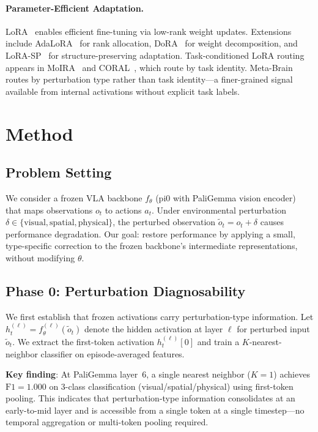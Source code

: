 \documentclass[10pt,twocolumn]{article}
\newcommand{\ours}{Meta-Brain}
\begin{document}
\paragraph{Parameter-Efficient Adaptation.}
LoRA~\cite{hu2021lora} enables efficient fine-tuning via low-rank weight updates.
Extensions include AdaLoRA~\cite{zhang2023adalora} for rank allocation, DoRA~\cite{liu2024dora} for weight decomposition, and LoRA-SP~\cite{lorasp2025} for structure-preserving adaptation.
Task-conditioned LoRA routing appears in MoIRA~\cite{moira2025} and CORAL~\cite{coral2025}, which route by task identity.
\ours{} routes by perturbation type rather than task identity---a finer-grained signal available from internal activations without explicit task labels.


\section{Method}
\label{sec:method}

\subsection{Problem Setting}
\label{sec:problem}

We consider a frozen VLA backbone $f_\theta$ (pi0 with PaliGemma vision encoder) that maps observations $o_t$ to actions $a_t$.
Under environmental perturbation $\delta \in \{\text{visual}, \text{spatial}, \text{physical}\}$, the perturbed observation $\tilde{o}_t = o_t + \delta$ causes performance degradation.
Our goal: restore performance by applying a small, type-specific correction to the frozen backbone's intermediate representations, without modifying $\theta$.

\subsection{Phase 0: Perturbation Diagnosability}
\label{sec:phase0}

We first establish that frozen activations carry perturbation-type information.
Let $h_t^{(\ell)} = f_\theta^{(\ell)}(\tilde{o}_t)$ denote the hidden activation at layer $\ell$ for perturbed input $\tilde{o}_t$.
We extract the first-token activation $h_t^{(\ell)}[0]$ and train a $K$-nearest-neighbor classifier on episode-averaged features.

\textbf{Key finding}: At PaliGemma layer~6, a single nearest neighbor ($K{=}1$) achieves $\text{F1}{=}1.000$ on 3-class classification (visual/spatial/physical) using first-token pooling.
This indicates that perturbation-type information consolidates at an early-to-mid layer and is accessible from a single token at a single timestep---no temporal aggregation or multi-token pooling required.
\end{document}
